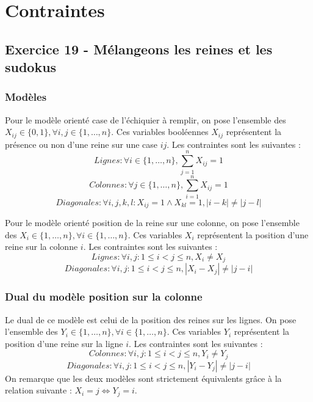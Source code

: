 
\chapter{Contraintes}\label{chap6}

\section{Exercice 19 - Mélangeons les reines et les sudokus}

\subsection{Modèles}
Pour le modèle orienté case de l'échiquier à remplir, on pose l'ensemble des $X_{ij} \in \{0,1\}, \forall i,j \in \{1,\ldots,n\}$. Ces variables booléennes $X_{ij}$ représentent la présence ou non d'une reine sur une case $ij$. Les contraintes sont les suivantes :
$$ Lignes : \forall i \in \{1,\ldots,n\}, \sum\limits_{j=1}^{n}{X_{ij}} = 1 $$
$$ Colonnes : \forall j \in \{1,\ldots,n\}, \sum\limits_{i=1}^{n}{X_{ij}} = 1 $$
$$ Diagonales : \forall i,j,k,l : X_{ij} = 1 \wedge X_{kl} = 1 , |i - k| \ne |j-l| $$

Pour le modèle orienté position de la reine sur une colonne, on pose l'ensemble des $X_{i} \in \{1,\ldots,n\}, \forall i \in \{1,\ldots,n\}$. Ces variables $X_{i}$ représentent la position d'une reine sur la colonne $i$. Les contraintes sont les suivantes :
$$ Lignes : \forall i,j : 1 \leq i < j \leq n, X_i \ne X_j $$
$$ Diagonales : \forall i,j : 1 \leq i < j \leq n, |X_i - X_j| \ne |j-i| $$

\subsection{Dual du modèle position sur la colonne}
Le dual de ce modèle est celui de la position des reines sur les lignes. On pose l'ensemble des $Y_{i} \in \{1,\ldots,n\}, \forall i \in \{1,\ldots,n\}$. Ces variables $Y_{i}$ représentent la position d'une reine sur la ligne $i$. Les contraintes sont les suivantes :
$$ Colonnes : \forall i,j : 1 \leq i < j \leq n, Y_i \ne Y_j $$
$$ Diagonales : \forall i,j : 1 \leq i < j \leq n, |Y_i - Y_j| \ne |j-i| $$
On remarque que les deux modèles sont strictement équivalents grâce à la relation suivante : $X_i = j \iff Y_j = i$.

